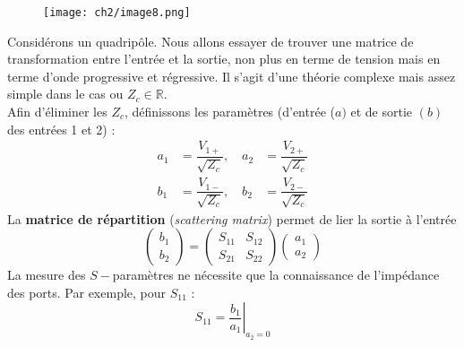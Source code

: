	\begin{figure}
	\vspace{-5mm}
	\texttt{[image: ch2/image8.png]}
	\end{figure}
Considérons un quadripôle. Nous allons essayer de trouver une matrice de transformation entre 
l'entrée et la sortie, non plus en terme de tension mais en terme d'onde progressive et 
régressive. Il s'agit d'une théorie complexe mais assez simple dans le cas ou $Z_c\in\mathbb{R}$.\\
Afin d'éliminer les $Z_c$, définissons les paramètres (d'entrée ($a)$ et de sortie $(b)$ des 
entrées 1 et 2) :
\begin{equation}
\begin{aligned}
a_1 &= \dfrac{V_{1+}}{\sqrt{Z_c}},\quad a_2 &= \dfrac{V_{2+}}{\sqrt{Z_c}}\\
b_1 &= \dfrac{V_{1-}}{\sqrt{Z_c}},\quad b_2 &= \dfrac{V_{2-}}{\sqrt{Z_c}}
\end{aligned}
\end{equation}
La \textbf{matrice de répartition} (\textit{scattering matrix}) permet de lier la sortie 
à l'entrée
\begin{equation}
\left(\begin{array}{c}
b_1\\
b_2
\end{array}\right) = \left(\begin{array}{cc}
S_{11} & S_{12}\\
S_{21} & S_{22}
\end{array}\right)\left(\begin{array}{c}
a_1\\
a_2
\end{array}\right)
\end{equation}
La mesure des $S-$paramètres ne nécessite que la connaissance de l'impédance des ports. Par 
exemple, pour $S_{11}$ :
\begin{equation}
S_{11} = \left.\dfrac{b_1}{a_1}\right|_{a_2=0}
\end{equation}
	
	
